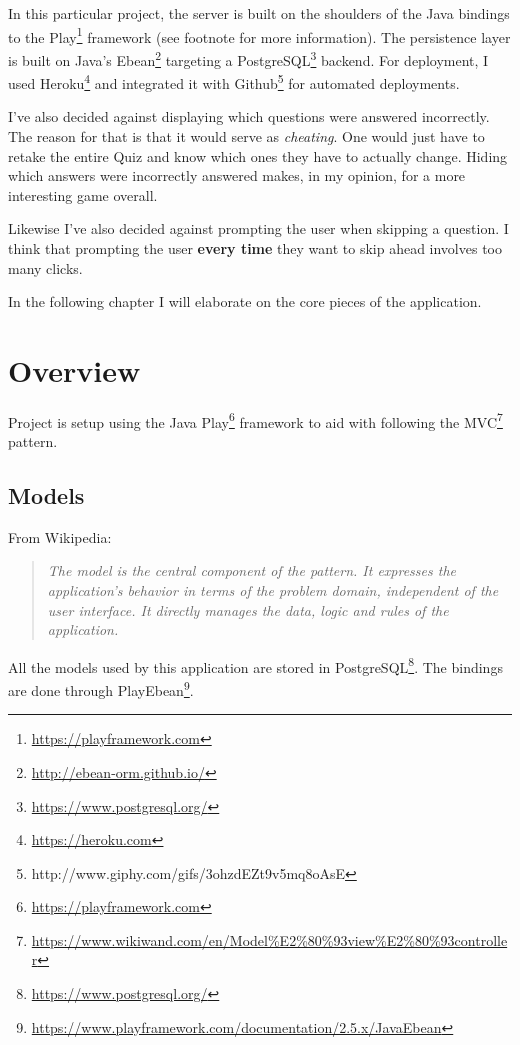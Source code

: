\documentclass[english,a4paper,]{report}
\renewcommand{\href}[2]{#2\footnote{\url{#1}}}
\begin{document}
In this particular project, the server is built on the shoulders of the
Java bindings to the \href{https://playframework.com}{Play} framework
(see footnote for more information). The persistence layer is built on
Java's \href{http://ebean-orm.github.io/}{Ebean} targeting a
\href{https://www.postgresql.org/}{PostgreSQL} backend. For deployment,
I used \href{https://heroku.com}{Heroku} and integrated it with
Github\footnote{http://www.giphy.com/gifs/3ohzdEZt9v5mq8oAsE} for
automated deployments.

I've also decided against displaying which questions were answered
incorrectly. The reason for that is that it would serve as
\emph{cheating}. One would just have to retake the entire Quiz and know
which ones they have to actually change. Hiding which answers were
incorrectly answered makes, in my opinion, for a more interesting game
overall.

Likewise I've also decided against prompting the user when skipping a
question. I think that prompting the user \textbf{every time} they want
to skip ahead involves too many clicks.

In the following chapter I will elaborate on the core pieces of the
application.

\chapter{Overview}\label{overview}

Project is setup using the Java \href{https://playframework.com}{Play}
framework to aid with following the
\href{https://www.wikiwand.com/en/Model\%E2\%80\%93view\%E2\%80\%93controller}{MVC}
pattern.

\section{Models}\label{models}

From Wikipedia:

\begin{quote}
\emph{The model is the central component of the pattern. It expresses
the application's behavior in terms of the problem domain, independent
of the user interface. It directly manages the data, logic and rules of
the application.}
\end{quote}

All the models used by this application are stored in
\href{https://www.postgresql.org/}{PostgreSQL}. The bindings are done
through
\href{https://www.playframework.com/documentation/2.5.x/JavaEbean}{PlayEbean}.
\end{document}
